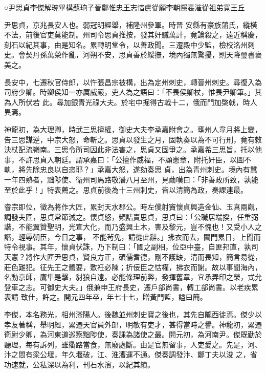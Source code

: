 
\begin{pinyinscope}

 ○尹思貞李傑解琬畢構蘇珦子晉鄭惟忠王志愔盧從願李朝隱裴漼從祖弟寬王丘



 尹思貞，京兆長安人也。弱冠明經舉，補隆州參軍。時晉
 安縣有豪族蒲氏，縱橫不法，前後官吏莫能制。州司令思貞推按，發其奸贓萬計，竟論殺之，遠近稱慶，刻石以紀其事，由是知名。累轉明堂令，以善政聞。三遷殿中少監，檢校洺州刺史。會契丹孫萬榮作亂，河朔不安，思貞善於綏撫，境內獨無驚擾，則天降璽書褒美之。



 長安中，七遷秋官侍郎，以忤張昌宗被構，出為定州刺史，轉晉州刺史。尋復入為司府少卿。時卿侯知一亦厲威嚴，吏人為之語曰：「不畏侯卿杖，惟畏尹卿筆。」其為人所伏若
 此。尋加銀青光祿大夫。於宅中掘得古戟十二，俄而門加棨戟，時人異焉。



 神龍初，為大理卿，時武三思擅權，御史大夫李承嘉附會之。壅州人韋月將上變，告三思謀逆，中宗大怒，命斬之。思貞以發生之月，固執奏以為不可行刑，竟有敕決杖配流嶺南。三思令所司因此非法害之，思貞又固爭之。承嘉希三思旨，托以他事，不許思貞入朝廷。謂承嘉曰：「公擅作威福，不顧憲章，附托奸臣，以圖不軌，將先除忠良以自恣耶？」承嘉大怒，遂劾奏思
 貞，出為青州刺史。境內有蠶一年四熟者，黜陟使、衛州司馬路敬潛八月至州，見繭嘆曰：「非善政所致，孰能至於此乎！」特表薦之。思貞前後為十三州刺史，皆以清簡為政，奏課連最。



 睿宗即位，徵為將作大匠，累封天水郡公。時左僕射竇懷貞興造金仙、玉真兩觀，調發夫匠，思貞常節減之。懷貞怒，頻詰責思貞，思貞曰：「公職居端揆，任重弼諧，不能翼贊聖明，光宣大化，而乃盛興土木，害及黎元，豈不愧也！又受小人之譖，輕辱朝臣，今日之事，
 不能茍免，請從此辭。」拂衣而去，闔門累日，上聞而特令視事。其年，懷貞伏誅，乃下制曰：「國之副相，位亞中臺，自匪邦直，孰司天憲？將作大匠尹思貞，賢良方正，碩儒耆德，剛不護缺，清而畏知，簡言易從，莊色難犯。征先王之體要，敷衽必陳；折佞臣之怙權，拂衣而謝。故以事聞海內，名動京師，鷹隼是擊，豺狼自遠。必能條理前弊，發揮舊章，宜承弄印之榮，式允登車之志。可御史大夫。」俄兼申王府長史，遷戶部尚書，轉工部尚書。以老疾累表請
 致仕，許之。開元四年卒，年七十七，贈黃門監，謚曰簡。



 李傑，本名務光，相州滏陽人。後魏並州刺史寶之後也，其先自隴西徙焉。傑少以孝友著稱，舉明經，累遷天官員外郎，明敏有吏才，甚得當時之譽。神龍初，累遷衛尉少卿，為河東道巡察黜陟使，奏課為諸使之最。開元初，為河南尹。傑既勤於聽理，每有訴列，雖衢路當食，無廢處斷。由是官無留事，人吏愛之。先是，河、汴之間有梁公堰，年久堰破，江、淮漕運不通。傑奏調發汴、鄭丁夫以浚
 之，省功速就，公私深以為利，刊石水濱，以紀其績。




\end{pinyinscope}
